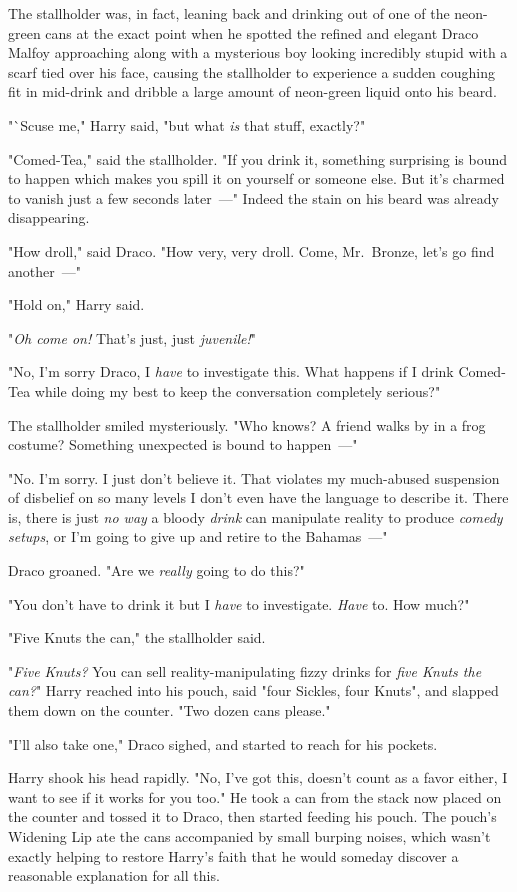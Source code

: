 The stallholder was, in fact, leaning back and drinking out of one of the
neon-green cans at the exact point when he spotted the refined and elegant
Draco Malfoy approaching along with a mysterious boy looking incredibly stupid
with a scarf tied over his face, causing the stallholder to experience a sudden
coughing fit in mid-drink and dribble a large amount of neon-green liquid onto
his beard.

"`Scuse me," Harry said, "but what \emph{is} that stuff, exactly?"

"Comed-Tea," said the stallholder. "If you drink it, something surprising is
bound to happen which makes you spill it on yourself or someone else. But it's
charmed to vanish just a few seconds later~---" Indeed the stain on his beard
was already disappearing.

"How droll," said Draco. "How very, very droll. Come, Mr.~Bronze, let's go find
another~---"

"Hold on," Harry said.

"\emph{Oh come on!} That's just, just \emph{juvenile!}"

"No, I'm sorry Draco, I \emph{have} to investigate this. What happens if I
drink Comed-Tea while doing my best to keep the conversation completely
serious?"

The stallholder smiled mysteriously. "Who knows? A friend walks by in a frog
costume? Something unexpected is bound to happen~---"

"No. I'm sorry. I just don't believe it. That violates my much-abused
suspension of disbelief on so many levels I don't even have the language to
describe it. There is, there is just \emph{no way} a bloody \emph{drink} can
manipulate reality to produce \emph{comedy setups}, or I'm going to give up and
retire to the Bahamas~---"

Draco groaned. "Are we \emph{really} going to do this?"

"You don't have to drink it but I \emph{have} to investigate. \emph{Have} to.
How much?"

"Five Knuts the can," the stallholder said.

"\emph{Five Knuts?} You can sell reality-manipulating fizzy drinks for
\emph{five Knuts the can?}" Harry reached into his pouch, said "four Sickles,
four Knuts", and slapped them down on the counter. "Two dozen cans please."

"I'll also take one," Draco sighed, and started to reach for his pockets.

Harry shook his head rapidly. "No, I've got this, doesn't count as a favor
either, I want to see if it works for you too." He took a can from the stack
now placed on the counter and tossed it to Draco, then started feeding his
pouch. The pouch's Widening Lip ate the cans accompanied by small burping
noises, which wasn't exactly helping to restore Harry's faith that he would
someday discover a reasonable explanation for all this.

